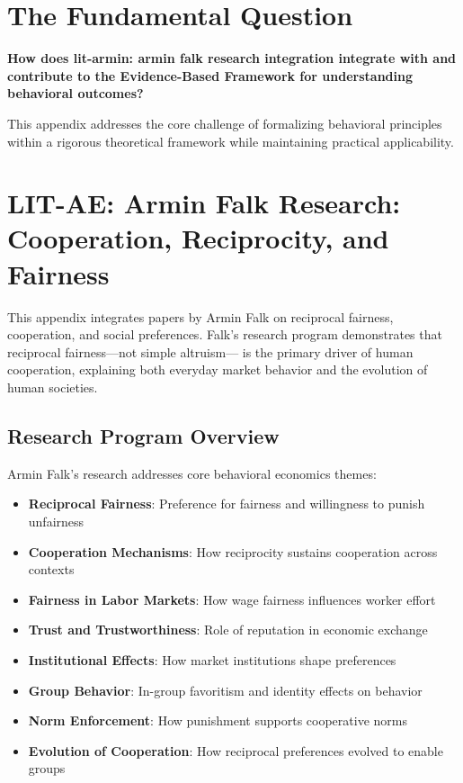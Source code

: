 \section{The Fundamental Question}
\label{sec:fal-fundamental}

\begin{tcolorbox}[
    colback=red!5!white,
    colframe=red!75!black,
    title={\textbf{Fundamental Question}}
]
\textbf{How does lit-armin: armin falk research integration integrate with and contribute to the
Evidence-Based Framework for understanding behavioral outcomes?}

This appendix addresses the core challenge of formalizing behavioral principles
within a rigorous theoretical framework while maintaining practical applicability.
\end{tcolorbox}




\section{LIT-AE: Armin Falk Research: Cooperation, Reciprocity, and Fairness}
\label{app:litae}

This appendix integrates papers by Armin Falk on reciprocal fairness, cooperation, and social
preferences. Falk's research program demonstrates that reciprocal fairness—not simple altruism—
is the primary driver of human cooperation, explaining both everyday market behavior and the
evolution of human societies.

\subsection{Research Program Overview}

Armin Falk's research addresses core behavioral economics themes:

\begin{itemize}
  \item \textbf{Reciprocal Fairness}: Preference for fairness and willingness to punish unfairness
  \item \textbf{Cooperation Mechanisms}: How reciprocity sustains cooperation across contexts
  \item \textbf{Fairness in Labor Markets}: How wage fairness influences worker effort
  \item \textbf{Trust and Trustworthiness}: Role of reputation in economic exchange
  \item \textbf{Institutional Effects}: How market institutions shape preferences
  \item \textbf{Group Behavior}: In-group favoritism and identity effects on behavior
  \item \textbf{Norm Enforcement}: How punishment supports cooperative norms
  \item \textbf{Evolution of Cooperation}: How reciprocal preferences evolved to enable groups
\end{itemize}

